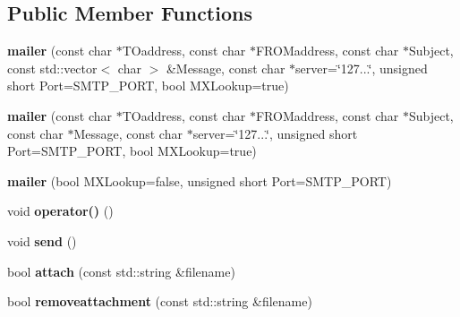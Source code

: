 \subsection*{Public Member Functions}
\begin{DoxyCompactItemize}
\item 
\hypertarget{classjwsmtp_1_1mailer_aa503174a1bfb40f7d6018240108f8e81}{{\bfseries mailer} (const char $\ast$T\-Oaddress, const char $\ast$F\-R\-O\-Maddress, const char $\ast$Subject, const std\-::vector$<$ char $>$ \&Message, const char $\ast$server=\char`\"{}127...\char`\"{}, unsigned short Port=S\-M\-T\-P\-\_\-\-P\-O\-R\-T, bool M\-X\-Lookup=true)}\label{classjwsmtp_1_1mailer_aa503174a1bfb40f7d6018240108f8e81}

\item 
\hypertarget{classjwsmtp_1_1mailer_a7bdd0c339465239da192b87622fb47af}{{\bfseries mailer} (const char $\ast$T\-Oaddress, const char $\ast$F\-R\-O\-Maddress, const char $\ast$Subject, const char $\ast$Message, const char $\ast$server=\char`\"{}127...\char`\"{}, unsigned short Port=S\-M\-T\-P\-\_\-\-P\-O\-R\-T, bool M\-X\-Lookup=true)}\label{classjwsmtp_1_1mailer_a7bdd0c339465239da192b87622fb47af}

\item 
\hypertarget{classjwsmtp_1_1mailer_a95ce2db188c5efed81c689d3fb1bba15}{{\bfseries mailer} (bool M\-X\-Lookup=false, unsigned short Port=S\-M\-T\-P\-\_\-\-P\-O\-R\-T)}\label{classjwsmtp_1_1mailer_a95ce2db188c5efed81c689d3fb1bba15}

\item 
\hypertarget{classjwsmtp_1_1mailer_a64a9eee2d170acf7463daf2bdd278ccb}{void {\bfseries operator()} ()}\label{classjwsmtp_1_1mailer_a64a9eee2d170acf7463daf2bdd278ccb}

\item 
\hypertarget{classjwsmtp_1_1mailer_a1e797008e879c8d5f0bd5a24c96b4cbd}{void {\bfseries send} ()}\label{classjwsmtp_1_1mailer_a1e797008e879c8d5f0bd5a24c96b4cbd}

\item 
\hypertarget{classjwsmtp_1_1mailer_a9ce0dcada15b7afe5c48fea57c28140d}{bool {\bfseries attach} (const std\-::string \&filename)}\label{classjwsmtp_1_1mailer_a9ce0dcada15b7afe5c48fea57c28140d}

\item 
\hypertarget{classjwsmtp_1_1mailer_a19da3595b2a9cb61555e9b5568c55005}{bool {\bfseries removeattachment} (const std\-::string \&filename)}\label{classjwsmtp_1_1mailer_a19da3595b2a9cb61555e9b5568c55005}


\end{DoxyCompactItemize}
